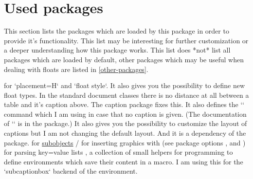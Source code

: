 
\section{Used packages}
\label{used-packages}

This section lists the packages which are loaded by this package in order to provide it's functionality.
This list may be interesting for further customization or a deeper understanding how this package works.
This list does *not* list all packages which are loaded by default, other packages which may be useful when dealing with floats are listed in \cref{other-packages}.

  for `placement=H` and `float style`.
  It also gives you the possibility to define new float types.
  In the standard document classes there is no distance at all between a table and it's caption above.
  The caption package fixes this.
  It also defines the `` command which I am using in case that no caption is given.
  (The documentation of `` is in the  package.)
  It also gives you the possibility to customize the layout of captions but I am not changing the default layout.
  And it is a dependency of the  package.
  for \hyperref[subobject-environment]{subobjects}
/
  for inserting graphics with  %
  (see package options ,  and )
  for parsing key=value lists
,
  a collection of small helpers for programming
  to define environments which save their content in a macro.
  I am using this for the `subcaptionbox` backend of the  environment.
\endpkgdoc

